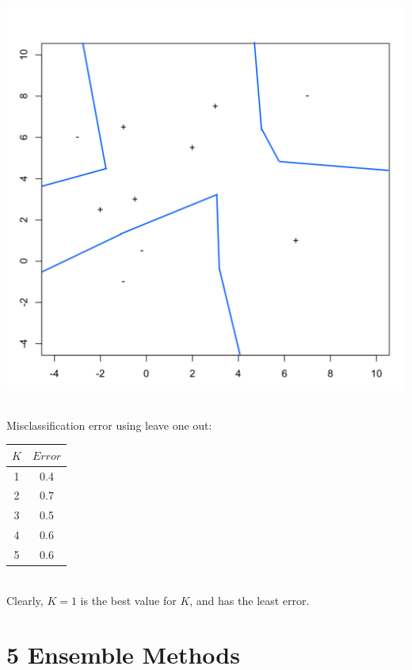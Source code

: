 \documentclass[12pt, oneside]{article}   	%
\begin{document}
\subsection{}

\includegraphics[scale=0.6]{approxDecisionBoundary}

\subsection{}

Misclassification error using leave one out: \\

\begin{tabular}{| c | c |}
	\hline
	$K$ & $Error$ \\
	\hline
	1 & 0.4\\
	\hline
	2 & 0.7\\
	\hline
	3 & 0.5\\
	\hline
	4 & 0.6\\
	\hline
	5 & 0.6\\ 
	\hline
\end{tabular}
\\

Clearly, $K=1$ is the best value for $K$, and has the least error.

\section{5 Ensemble Methods}
\end{document}
